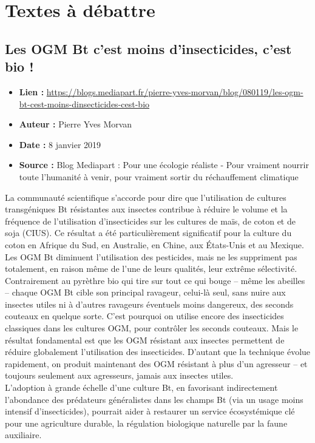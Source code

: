 \documentclass[8pt]{article}
\begin{document}
\newpage
\section{Textes à débattre}
\subsection{Les OGM Bt c'est moins d'insecticides, c'est bio ! }
\label{sec:Bt}

\begin{itemize}
	\item \textbf{Lien : }  \url{https://blogs.mediapart.fr/pierre-yves-morvan/blog/080119/les-ogm-bt-cest-moins-dinsecticides-cest-bio} 
	\item \textbf{Auteur : } Pierre Yves Morvan
	\item \textbf{Date : }  8 janvier 2019
	\item \textbf{Source : } Blog Mediapart : Pour une écologie réaliste - Pour vraiment nourrir toute l'humanité à venir, pour vraiment sortir du réchauffement climatique
\end{itemize}

La communauté scientifique s’accorde pour dire que l’utilisation de cultures transgéniques Bt résistantes aux insectes contribue à réduire le volume et la fréquence de l’utilisation d’insecticides sur les cultures de maïs, de coton et de soja (CIUS). Ce résultat a été particulièrement significatif pour la culture du coton en Afrique du Sud, en Australie, en Chine, aux États-Unis et au Mexique.\\

Les OGM Bt diminuent l'utilisation des pesticides, mais ne les suppriment pas totalement, en raison même de l'une de leurs qualités, leur extrême sélectivité. Contrairement au pyrèthre bio qui tire sur tout ce qui bouge – même les abeilles – chaque OGM Bt cible son principal ravageur, celui-là seul, sans nuire aux insectes utiles ni à d’autres ravageurs éventuels moins dangereux, des seconds couteaux en quelque sorte. C’est pourquoi on utilise encore des insecticides classiques dans les cultures OGM, pour contrôler les seconds couteaux. Mais le résultat fondamental est que les OGM résistant aux insectes permettent de réduire globalement l’utilisation des insecticides. D'autant que la technique évolue rapidement, on produit maintenant des OGM résistant à plus d'un agresseur – et toujours seulement aux agresseurs, jamais aux insectes utiles. \\

L'adoption à grande échelle d’une culture Bt, en favorisant indirectement l'abondance des prédateurs généralistes dans les champs Bt (via un usage moins intensif d’insecticides), pourrait aider à restaurer un service écosystémique clé pour une agriculture durable, la régulation biologique naturelle par la faune auxiliaire.\\
\end{document}
